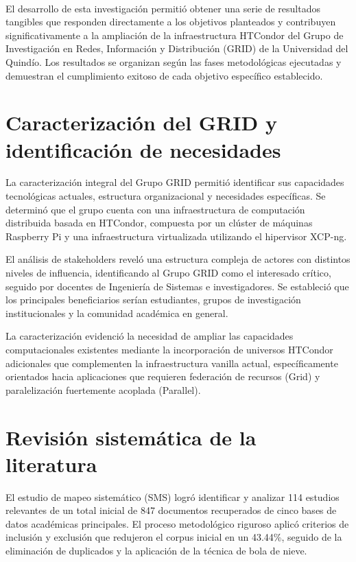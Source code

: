 \label{cap:resultados}
\mbox{}\\

El desarrollo de esta investigación permitió obtener una serie de resultados tangibles que responden directamente a los objetivos planteados y contribuyen significativamente a la ampliación de la infraestructura HTCondor del Grupo de Investigación en Redes, Información y Distribución (GRID) de la Universidad del Quindío. Los resultados se organizan según las fases metodológicas ejecutadas y demuestran el cumplimiento exitoso de cada objetivo específico establecido.

\section{Caracterización del GRID y identificación de necesidades}
\noindent

La caracterización integral del Grupo GRID permitió identificar sus capacidades tecnológicas actuales, estructura organizacional y necesidades específicas. Se determinó que el grupo cuenta con una infraestructura de computación distribuida basada en HTCondor, compuesta por un clúster de máquinas Raspberry Pi y una infraestructura virtualizada utilizando el hipervisor XCP-ng. 

El análisis de stakeholders reveló una estructura compleja de actores con distintos niveles de influencia, identificando al Grupo GRID como el interesado crítico, seguido por docentes de Ingeniería de Sistemas e investigadores. Se estableció que los principales beneficiarios serían estudiantes, grupos de investigación institucionales y la comunidad académica en general.

La caracterización evidenció la necesidad de ampliar las capacidades computacionales existentes mediante la incorporación de universos HTCondor adicionales que complementen la infraestructura vanilla actual, específicamente orientados hacia aplicaciones que requieren federación de recursos (Grid) y paralelización fuertemente acoplada (Parallel).

\section{Revisión sistemática de la literatura}
\noindent

El estudio de mapeo sistemático (SMS) logró identificar y analizar 114 estudios relevantes de un total inicial de 847 documentos recuperados de cinco bases de datos académicas principales. El proceso metodológico riguroso aplicó criterios de inclusión y exclusión que redujeron el corpus inicial en un 43.44\%, seguido de la eliminación de duplicados y la aplicación de la técnica de bola de nieve.

